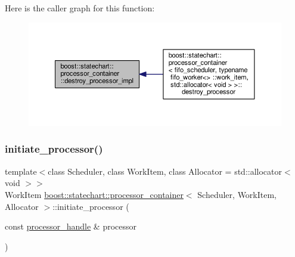 Here is the caller graph for this function\+:
\nopagebreak
\begin{figure}[H]
\begin{center}
\leavevmode
\includegraphics[width=350pt]{classboost_1_1statechart_1_1processor__container_a50b4db6dac9debb3b9e9e50f25af74f3_icgraph}
\end{center}
\end{figure}
\mbox{\label{classboost_1_1statechart_1_1processor__container_a605121c8af1bd1ab65cb65531da0cac8}} 
\subsubsection{\texorpdfstring{initiate\+\_\+processor()}{initiate\_processor()}}
{\footnotesize\ttfamily template$<$class Scheduler, class Work\+Item, class Allocator = std\+::allocator$<$ void $>$$>$ \\
Work\+Item \mbox{\hyperlink{classboost_1_1statechart_1_1processor__container}{boost\+::statechart\+::processor\+\_\+container}}$<$ Scheduler, Work\+Item, Allocator $>$\+::initiate\+\_\+processor (\begin{DoxyParamCaption}\item[{const \mbox{\hyperlink{classboost_1_1statechart_1_1processor__container_a82ebbffaed81d7b99119ae0e892f6411}{processor\+\_\+handle}} \&}]{processor }\end{DoxyParamCaption})\hspace{0.3cm}{\ttfamily [inline]}}

